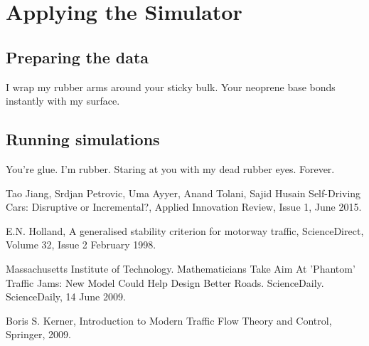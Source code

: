 \chapter{Applying the Simulator}
\thispagestyle{fancy} %
\section{Preparing the data}
I wrap my rubber arms around your sticky bulk. Your neoprene base bonds instantly with my surface.
\section{Running simulations}
You’re glue. I’m rubber. Staring at you with my dead rubber eyes. Forever.


\begin{thebibliography}{9}

	Tao Jiang, Srdjan Petrovic, Uma Ayyer, Anand Tolani, Sajid Husain
	Self-Driving Cars: Disruptive or Incremental?,
	Applied Innovation Review,
	Issue 1,
	June 2015.

	E.N. Holland,
	A generalised stability criterion for motorway traffic,
	ScienceDirect,
	Volume 32,
	Issue 2
	February 1998.

	Massachusetts Institute of Technology. 
	Mathematicians Take Aim At 'Phantom' Traffic Jams: New Model Could Help Design Better Roads.
	ScienceDaily. 
	ScienceDaily,
	14 June 2009.

	Boris S. Kerner,
	Introduction to Modern Traffic Flow Theory and Control,
	Springer,
	2009.

\end{thebibliography}
